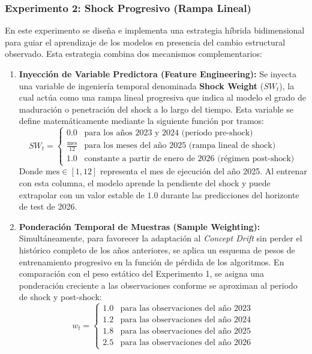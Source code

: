 \documentclass[a4paper,11pt,openany]{book}
\begin{document}
\subsubsection{Experimento 2: Shock Progresivo (Rampa Lineal)}
En este experimento se diseña e implementa una estrategia híbrida bidimensional para guiar el aprendizaje de los modelos en presencia del cambio estructural observado. Esta estrategia combina dos mecanismos complementarios:

\begin{enumerate}
    \item \textbf{Inyección de Variable Predictora (Feature Engineering):} Se inyecta una variable de ingeniería temporal denominada \textbf{Shock Weight} ($SW_t$), la cual actúa como una rampa lineal progresiva que indica al modelo el grado de maduración o penetración del shock a lo largo del tiempo. Esta variable se define matemáticamente mediante la siguiente función por tramos:
    \begin{equation}
    SW_t = \begin{cases} 
    0.0 & \text{para los años 2023 y 2024 (periodo pre-shock)} \\
    \frac{\text{mes}}{12} & \text{para los meses del año 2025 (rampa lineal de shock)} \\
    1.0 & \text{constante a partir de enero de 2026 (régimen post-shock)}
    \end{cases}
    \end{equation}
    Donde $\text{mes} \in [1, 12]$ representa el mes de ejecución del año 2025. Al entrenar con esta columna, el modelo aprende la pendiente del shock y puede extrapolar con un valor estable de $1.0$ durante las predicciones del horizonte de test de 2026.
    
    \item \textbf{Ponderación Temporal de Muestras (Sample Weighting):} Simultáneamente, para favorecer la adaptación al \textit{Concept Drift} sin perder el histórico completo de los años anteriores, se aplica un esquema de pesos de entrenamiento progresivo en la función de pérdida de los algoritmos. En comparación con el peso estático del Experimento 1, se asigna una ponderación creciente a las observaciones conforme se aproximan al periodo de shock y post-shock:
    \begin{equation}
    w_t = \begin{cases} 
    1.0 & \text{para las observaciones del año 2023} \\
    1.2 & \text{para las observaciones del año 2024} \\
    1.8 & \text{para las observaciones del año 2025} \\
    2.5 & \text{para las observaciones del año 2026}
    \end{cases}
    \end{equation}
\end{enumerate}
\end{document}
